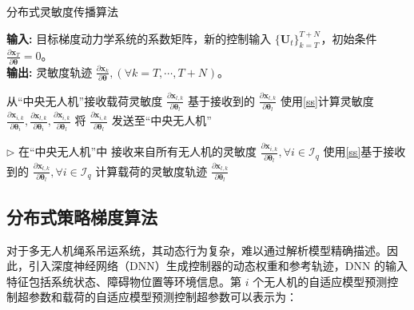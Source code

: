 \documentclass[lang=chs, degree=master, blindreview=false, winfonts=true]{yanputhesis}
\begin{document}
\begin{algorithm}[H]
	\linespread{1.2}\selectfont %
	\caption{分布式灵敏度传播算法}
	\label{alg:sensitivity_propagation}
	\textbf{输入:} 目标梯度动力学系统的系数矩阵，新的控制输入 $\{\bm{U}_t\}_{k=T}^{T+N_{\text{}}}$，初始条件 ${\frac{\partial \bm{x}_{T}}{\partial \bm{\theta}}} = 0$。\\
	\textbf{输出:} 灵敏度轨迹 ${\frac{\partial \bm{x}_{k}}{\partial \bm{\theta}}}, (\forall k = T, \cdots, T+N_{\text{}})$。
	
	\begin{algorithmic}[1]
		\State 从“中央无人机”接收载荷灵敏度 $\frac{\partial \bm{x}_{l,k}}{\partial \bm{\theta}_l}$
		\State 基于接收到的 $\frac{\partial \bm{x}_{l,k}}{\partial \bm{\theta}_l}$ 使用\autoref{ss}计算灵敏度 $\frac{\partial \bm{x}_{i,k}}{\partial \bm{\theta}_i}, \frac{\partial \bm{x}_{l,k}}{\partial \bm{\theta}_i}, \frac{\partial \bm{x}_{i,k}}{\partial \bm{\theta}_l}$
		\State 将 $\frac{\partial \bm{x}_{i,k}}{\partial \bm{\theta}_l}$ 发送至“中央无人机”
		\EndFor
		\EndFor
		
		\Statex $\triangleright$ 在“中央无人机”中
		\State 接收来自所有无人机的灵敏度 $\frac{\partial \bm{x}_{i,k}}{\partial \bm{\theta}_l}, \forall i \in \mathcal{I}_q$
		\State 使用\autoref{ss}基于接收到的 $\frac{\partial \bm{x}_{l,k}}{\partial \bm{\theta}_l}, \forall i \in \mathcal{I}_q$ 计算载荷的灵敏度轨迹 $\frac{\partial \bm{x}_{l,k}}{\partial \bm{\theta}_l}$
		\EndFor
	\end{algorithmic}
\end{algorithm}

\subsection{分布式策略梯度算法}
对于多无人机绳系吊运系统，其动态行为复杂，难以通过解析模型精确描述。因此，引入深度神经网络（DNN）生成控制器的动态权重和参考轨迹，DNN 的输入特征包括系统状态、障碍物位置等环境信息。第 \(i\) 个无人机的自适应模型预测控制超参数和载荷的自适应模型预测控制超参数可以表示为：
\end{document}
